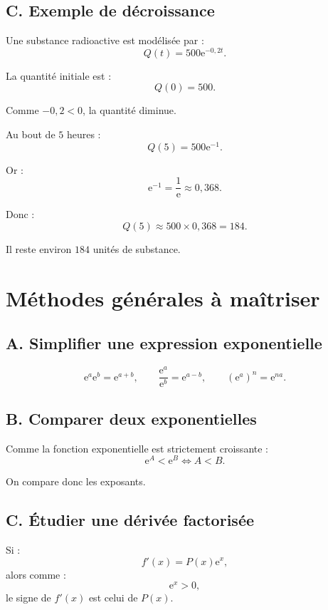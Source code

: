\documentclass[11pt,a4paper]{article}
\newcommand{\e}{\mathrm{e}}
\begin{document}
\subsection*{C. Exemple de décroissance}

\begin{exemplebox}
Une substance radioactive est modélisée par :
\[
Q(t)=500\e^{-0,2t}.
\]

La quantité initiale est :
\[
Q(0)=500.
\]

Comme $-0,2<0$, la quantité diminue.

Au bout de $5$ heures :
\[
Q(5)=500\e^{-1}.
\]

Or :
\[
\e^{-1}=\frac{1}{\e}\approx 0,368.
\]

Donc :
\[
Q(5)\approx 500\times 0,368=184.
\]

Il reste environ $184$ unités de substance.
\end{exemplebox}

\section{Méthodes générales à maîtriser}

\subsection*{A. Simplifier une expression exponentielle}

\begin{methode}
\[
\e^a\e^b=\e^{a+b},
\qquad
\frac{\e^a}{\e^b}=\e^{a-b},
\qquad
(\e^a)^n=\e^{na}.
\]
\end{methode}

\subsection*{B. Comparer deux exponentielles}

\begin{methode}
Comme la fonction exponentielle est strictement croissante :
\[
\e^A<\e^B \Longleftrightarrow A<B.
\]

On compare donc les exposants.
\end{methode}

\subsection*{C. Étudier une dérivée factorisée}

\begin{methode}
Si :
\[
f'(x)=P(x)\e^x,
\]
alors comme :
\[
\e^x>0,
\]
le signe de $f'(x)$ est celui de $P(x)$.
\end{methode}
\end{document}
